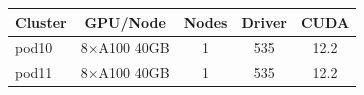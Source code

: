 \begin{tabular}{lcccc}
\toprule
Cluster & GPU/Node & Nodes & Driver & CUDA \\
\midrule
pod10 & 8×A100 40GB & 1 & 535 & 12.2 \\
pod11 & 8×A100 40GB & 1 & 535 & 12.2 \\
\bottomrule
\end{tabular}
